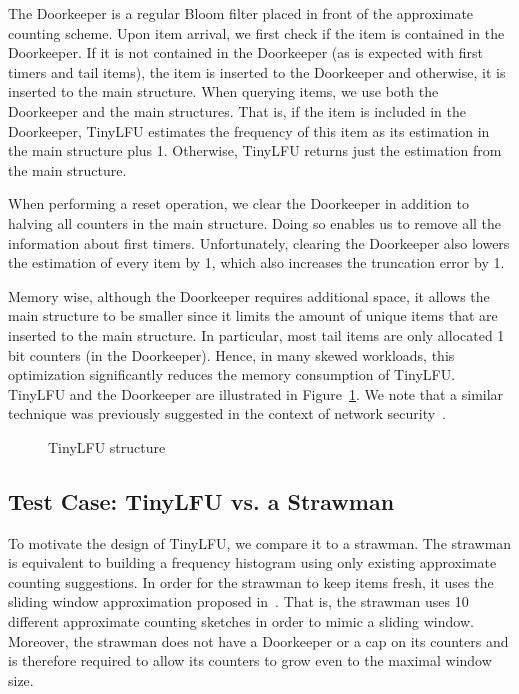 \documentclass[10pt,a4paper]{article}
\begin{document}
The Doorkeeper is a regular Bloom filter placed in front of the approximate counting scheme.
Upon item arrival, we first check if the item is contained in the Doorkeeper.
If it is not contained in the Doorkeeper (as is expected with first timers and tail items), the item is inserted to the Doorkeeper and otherwise, it is inserted to the main structure.
When querying items, we use both the Doorkeeper and the main structures.
That is, if the item is included in the Doorkeeper, TinyLFU estimates the frequency of this item as its estimation in the main structure plus 1.
Otherwise, TinyLFU returns just the estimation from the main structure.

When performing a reset operation, we clear the Doorkeeper in addition to halving all counters in the main structure.
Doing so enables us to remove all the information about first timers.
Unfortunately, clearing the Doorkeeper also lowers the estimation of every item by 1, which also increases the truncation error by 1.

Memory wise, although the Doorkeeper requires additional space, it allows the main structure to be smaller since it limits the amount of unique items that are inserted to the main structure.
In particular, most tail items are only allocated 1 bit counters (in the Doorkeeper).
Hence, in many skewed workloads, this optimization significantly reduces the memory consumption of TinyLFU.
TinyLFU and the Doorkeeper are illustrated in Figure~\ref{fig:tinyLFU}.
We note that a similar technique was previously suggested in the context of network security~\cite{DoorKeeper}.

\begin{figure}[t]
\caption{TinyLFU structure}
\label{fig:tinyLFU}
\end{figure}

\subsection{Test Case: TinyLFU vs. a Strawman}
To motivate the design of TinyLFU, we compare it to a strawman.
The strawman is equivalent to building a frequency histogram using only existing approximate counting suggestions.
In order for the strawman to keep items fresh, it uses the sliding window approximation proposed in~\cite{SUNSHINE}.
That is, the strawman uses 10 different approximate counting sketches in order to mimic a sliding window.
Moreover, the strawman does not have a Doorkeeper or a cap on its counters and is therefore required to allow its counters to grow even to the maximal window size.
\end{document}

